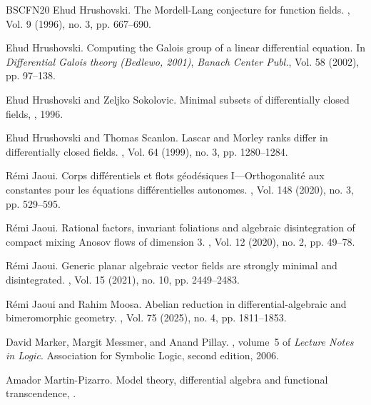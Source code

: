 \documentclass[12pt]{amsart}
\theoremstyle{definition}
\theoremstyle{plain}
\theoremstyle{exampstyle}
\theoremstyle{exampstyle}\newtheorem{thmxbis}{Theorem}
\numberwithin{equation}{section}
\theoremstyle{remark}
\begin{document}
\begin{thebibliography}{BSCFN20}
Ehud Hrushovski.
\newblock The {M}ordell-{L}ang conjecture for function fields.
, Vol. 9 (1996), no. 3, pp. 667--690.

Ehud Hrushovski.
\newblock Computing the {G}alois group of a linear differential equation.
\newblock In {\em Differential {G}alois theory ({B}edlewo, 2001)}, 
  {\em Banach Center Publ.}, Vol. 58 (2002), pp. 97--138. 

Ehud Hrushovski and Zeljko Sokolovic.
\newblock Minimal subsets of differentially closed fields,
, 1996.

Ehud Hrushovski and Thomas Scanlon.
\newblock Lascar and {M}orley ranks differ in differentially closed fields.
, Vol. 64 (1999), no. 3, pp. 1280--1284.

R\'{e}mi Jaoui.
\newblock Corps diff\'{e}rentiels et flots g\'{e}od\'{e}siques
  {I}---{O}rthogonalit\'{e} aux constantes pour les \'{e}quations
  diff\'{e}rentielles autonomes.
, Vol. 148 (2020), no. 3, pp. 529--595.

R\'{e}mi Jaoui.
\newblock Rational factors, invariant foliations and algebraic disintegration
  of compact mixing {A}nosov flows of dimension 3.
, Vol. 12 (2020), no. 2, pp. 49--78.

R\'{e}mi Jaoui.
\newblock Generic planar algebraic vector fields are strongly minimal and
  disintegrated.
, Vol. 15 (2021), no. 10, pp. 2449--2483.

R\'{e}mi Jaoui and Rahim Moosa.
\newblock Abelian reduction in differential-algebraic and bimeromorphic
  geometry.
, Vol. 75 (2025), no. 4, pp. 1811--1853.

David Marker, Margit Messmer, and Anand Pillay.
, volume~5 of {\em Lecture Notes in
  Logic}.
\newblock Association for Symbolic Logic,  second edition, 2006.

Amador Martin-Pizarro.
\newblock Model theory, differential algebra and functional transcendence,
.


\end{thebibliography}
\end{document}
